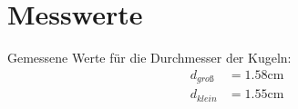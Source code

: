 \section{Messwerte}
\label{sec:Messwerte}

Gemessene Werte für die Durchmesser der Kugeln:
\begin{align*}
    d_{groß} &= 1.58\unit{\centi\meter}\\
    d_{klein} &= 1.55\unit{\centi\meter}\\
\end{align*}
